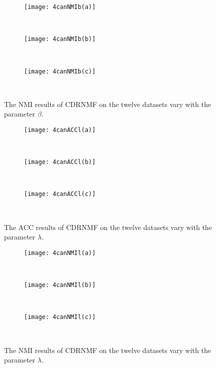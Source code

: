 \documentclass[a4paper,fleqn]{cas-sc}
\begin{document}
\begin{figure}[!t]
	\centering
	\begin{subfigure}[b]{.23\textwidth}
		\centering
		\texttt{[image: 4canNMIb(a)]}
		\caption{~}\label{subfig:4canNMIb(a)}
	\end{subfigure}
	\begin{subfigure}[b]{.23\textwidth}
		\centering
		\texttt{[image: 4canNMIb(b)]}
		\caption{~}\label{subfig:4canNMIb(b)}
	\end{subfigure}
	\begin{subfigure}[b]{.23\textwidth}
		\centering
		\texttt{[image: 4canNMIb(c)]}
		\caption{~}\label{subfig:4canNMIb(c)}
	\end{subfigure}
	
	\caption{The NMI results of CDRNMF on the twelve datasets vary with the parameter $\beta$.}\label{fig:4canNMIb}
\end{figure}

\begin{figure}[!t]
	\centering
	\begin{subfigure}[b]{.23\textwidth}
		\centering
		\texttt{[image: 4canACCl(a)]}
		\caption{~}\label{subfig:4canACCl(a)}
	\end{subfigure}
	\begin{subfigure}[b]{.23\textwidth}
		\centering
		\texttt{[image: 4canACCl(b)]}
		\caption{~}\label{subfig:4canACCl(b)}
	\end{subfigure}
	\begin{subfigure}[b]{.23\textwidth}
		\centering
		\texttt{[image: 4canACCl(c)]}
		\caption{~}\label{subfig:4canACCl(c)}
	\end{subfigure}
	
	\caption{The ACC results of CDRNMF on the twelve datasets vary with the parameter $\lambda$.}\label{fig:4canACCl}
\end{figure}

\begin{figure}[!t]
	\centering
	\begin{subfigure}[b]{.23\textwidth}
		\centering
		\texttt{[image: 4canNMIl(a)]}
		\caption{~}\label{subfig:4canNMIl(a)}
	\end{subfigure}
	\begin{subfigure}[b]{.23\textwidth}
		\centering
		\texttt{[image: 4canNMIl(b)]}
		\caption{~}\label{subfig:4canNMIl(b)}
	\end{subfigure}
	\begin{subfigure}[b]{.23\textwidth}
		\centering
		\texttt{[image: 4canNMIl(c)]}
		\caption{~}\label{subfig:4canNMIl(c)}
	\end{subfigure}
	
	\caption{The NMI results of CDRNMF on the twelve datasets vary with the parameter $\lambda$.}\label{fig:4canNMIl}
\end{figure}
\end{document}
